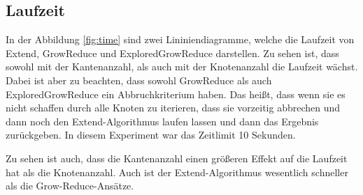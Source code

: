 \documentclass[12pt,a4paper,onecolumn,oneside,titlepage]{article}
\begin{document}
\subsection{Laufzeit}

In der Abbildung \ref{fig:time} sind zwei Lininiendiagramme, welche die Laufzeit von Extend, GrowReduce und ExploredGrowReduce darstellen. Zu sehen ist, dass sowohl mit der Kantenanzahl, als auch mit der Knotenanzahl die Laufzeit wächst. Dabei ist aber zu beachten, dass sowohl GrowReduce als auch ExploredGrowReduce ein Abbruchkriterium haben. Das heißt, dass wenn sie es nicht schaffen durch alle Knoten zu iterieren, dass sie vorzeitig abbrechen und dann noch den Extend-Algorithmus laufen lassen und dann das Ergebnis zurückgeben. In diesem Experiment war das Zeitlimit 10 Sekunden.

Zu sehen ist auch, dass die Kantenanzahl einen größeren Effekt auf die Laufzeit hat als die Knotenanzahl. Auch ist der Extend-Algorithmus wesentlich schneller als die Grow-Reduce-Ansätze.
\end{document}

